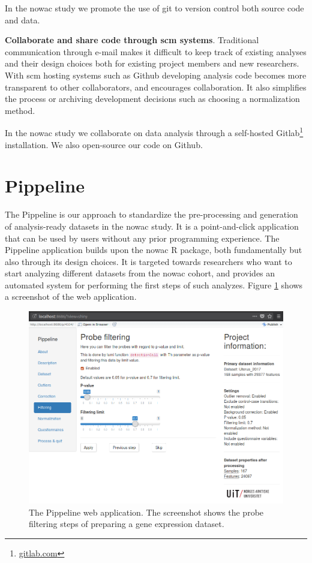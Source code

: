 In the \gls{nowac} study we promote the use of git to version control both
source code and data. 

\textbf{Collaborate and share code through \gls{scm} systems}. Traditional
communication through e-mail makes it difficult to keep track of existing
analyses and their design choices both for existing project members and new
researchers. With \gls{scm} hosting systems such as Github developing
analysis code becomes more transparent to other collaborators, and encourages
collaboration. It also simplifies the process or archiving development decisions
such as choosing a normalization method.

In the \gls{nowac} study we collaborate on data analysis through a self-hosted
Gitlab\footnote{\url{gitlab.com}} installation. We also open-source our code on
Github. 



\section{Pippeline}
The Pippeline is our approach to standardize the pre-processing and generation
of analysis-ready datasets in the \gls{nowac} study. It is a point-and-click
application that can be used by users without any prior programming experience.
The Pippeline application builds upon the \gls{nowac} R package, both
fundamentally but also through its design choices. It is targeted towards
researchers who want to start analyzing different datasets from the \gls{nowac}
cohort, and provides an automated system for performing the first steps of such
analyzes. 
Figure \ref{fig:scr_filtering} shows a screenshot of the web application.

\begin{figure}
  \includegraphics[width=\linewidth]{figures/scr_filtering.png}
  \caption{The Pippeline web application. The screenshot shows the probe
  filtering steps of preparing a gene expression dataset.}
  \label{fig:scr_filtering}
\end{figure}

